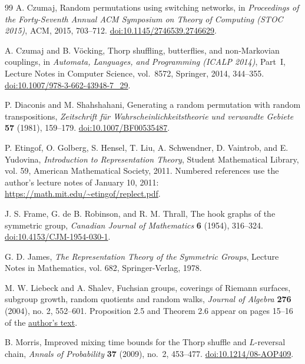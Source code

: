 \begin{thebibliography}{99}
A. Czumaj,
Random permutations using switching networks,
in \emph{Proceedings of the Forty-Seventh Annual ACM Symposium on
Theory of Computing (STOC 2015)}, ACM, 2015, 703--712.
\href{https://doi.org/10.1145/2746539.2746629}{doi:10.1145/2746539.2746629}.

A. Czumaj and B. V\"ocking,
Thorp shuffling, butterflies, and non-Markovian couplings,
in \emph{Automata, Languages, and Programming (ICALP 2014)}, Part~I,
Lecture Notes in Computer Science, vol.~8572, Springer, 2014, 344--355.
\href{https://doi.org/10.1007/978-3-662-43948-7_29}{doi:10.1007/978-3-662-43948-7\_29}.

P. Diaconis and M. Shahshahani,
Generating a random permutation with random transpositions,
\emph{Zeitschrift f\"ur Wahrscheinlichkeitstheorie und verwandte Gebiete}
\textbf{57} (1981), 159--179.
\href{https://doi.org/10.1007/BF00535487}{doi:10.1007/BF00535487}.

P. Etingof, O. Golberg, S. Hensel, T. Liu, A. Schwendner, D. Vaintrob, and E. Yudovina,
\emph{Introduction to Representation Theory},
Student Mathematical Library, vol. 59, American Mathematical Society, 2011.
Numbered references use the author's lecture notes of January 10, 2011:
\url{https://math.mit.edu/~etingof/replect.pdf}.

J. S. Frame, G. de B. Robinson, and R. M. Thrall,
The hook graphs of the symmetric group,
\emph{Canadian Journal of Mathematics} \textbf{6} (1954), 316--324.
\href{https://doi.org/10.4153/CJM-1954-030-1}{doi:10.4153/CJM-1954-030-1}.

G. D. James, \emph{The Representation Theory of the Symmetric Groups},
Lecture Notes in Mathematics, vol. 682, Springer-Verlag, 1978.

M. W. Liebeck and A. Shalev,
Fuchsian groups, coverings of Riemann surfaces, subgroup growth, random quotients and random walks,
\emph{Journal of Algebra} \textbf{276} (2004), no. 2, 552--601.
Proposition 2.5 and Theorem 2.6 appear on pages 15--16 of the
\href{https://www.ma.imperial.ac.uk/~mwl/fuchs.pdf}{author's text}.

B. Morris,
Improved mixing time bounds for the Thorp shuffle and $L$-reversal chain,
\emph{Annals of Probability} \textbf{37} (2009), no.~2, 453--477.
\href{https://doi.org/10.1214/08-AOP409}{doi:10.1214/08-AOP409}.


\end{thebibliography}
